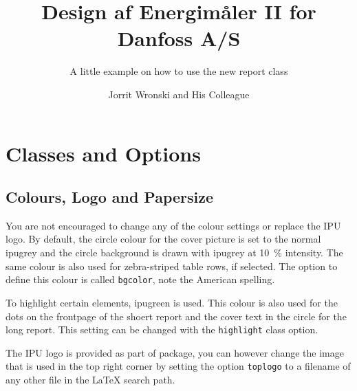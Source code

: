 \documentclass[short,comm,dots]{ipureport}
\title{Design af Energimåler II for Danfoss A/S}
\subtitle{A little example on how to use the new report class}
\author{Jorrit Wronski and His Colleague}
\begin{document}


\maketitle



\tableofcontents
\listoftodos

\cleardoublepage
\section{Classes and Options}

\subsection{Colours, Logo and Papersize}

You are not encouraged to change any of the colour settings or replace the IPU logo. By default, the circle colour for the cover picture is set to the normal ipugrey and the circle background is drawn with ipugrey at \SI{10}{\percent} intensity. The same colour is also used for zebra-striped table rows, if selected. The option to define this colour is called \texttt{bgcolor}, note the American spelling. 

To highlight certain elements, ipugreen is used. This colour is also used for the dots on the frontpage of the shoert report and the cover text in the circle for the long report. This setting can be changed with the \texttt{highlight} class option.

The IPU logo is provided as part of package, you can however change the image that is used in the top right corner by setting the option \texttt{toplogo} to a filename of any other file in the \LaTeX{} search path. 
\end{document}
